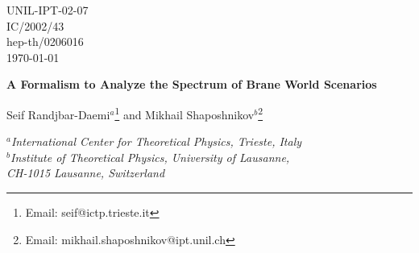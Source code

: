 \documentclass[a4paper,12pt]{article}
\begin{document}
\topmargin -1.0cm
\oddsidemargin -0.8cm
\evensidemargin -0.8cm
\pagestyle{empty}
\begin{flushright}
UNIL-IPT-02-07\\
IC/2002/43\\
hep-th/0206016\\
\today
\end{flushright}
\vspace*{5mm}



\begin{center}


{\Large\bf  A  Formalism to Analyze the Spectrum
of Brane World Scenarios}
\vspace{1.0cm}


{\large Seif Randjbar-Daemi$^a$\footnote{Email: seif@ictp.trieste.it}  and
Mikhail Shaposhnikov$^b$\footnote{Email:
mikhail.shaposhnikov@ipt.unil.ch}}\\

\vspace{.6cm}

{\it {$^{a}$International Center for Theoretical Physics,
Trieste, Italy}}\\
{\it {$^{b}$Institute of Theoretical Physics, University of
Lausanne,\\
CH-1015 Lausanne, Switzerland}}\\


\vspace{.4cm}
\end{center}


\vspace{1cm}
\begin{abstract}
In this paper we develop a formalism to analyze the spectrum of
small perturbations about arbitrary solutions of Einstein,
Yang-Mills and scalar systems. We consider a  general system of
gravitational, gauge and scalar fields in a $D-$dimensional
space-time and give the bilinear action for the fluctuations of
the fields in the system around an arbitrary solution of the
classical field equations. We then consider warped geometries,
popular in brane world scenarios, and use the light cone gauge to
separate the bilinear action into a totally decoupled spin-two,
-one and -zero fluctuations.  We apply our general scheme to
several examples and discuss in particular localization of abelian
and non-abelian gauge fields of the standard model to branes
generated by scalar fields. We show in particular that the
Nielsen-Olsen string solution gives rise to a normalizable
localized spin-1 field in any number of dimensions.
\end{abstract} 
\vfill
\end{document}
